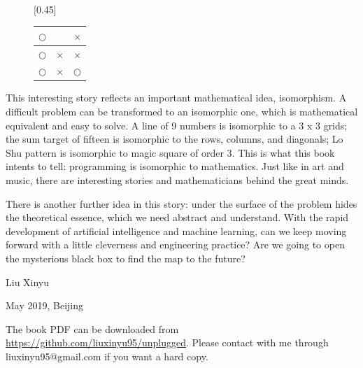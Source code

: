 \documentclass[UTF8]{article}
\begin{document}
\begin{figure}[htbp]
{\begin{tabular}{c|c|c}
   \end{tabular}
   \vspace{3mm}
 } \vspace{3mm} \\
 [0.45\linewidth]{
   \begin{tabular}{c|c|c}
   $\pmb{\bigcirc}$ &  & $\times$\\
   \hline
   $\pmb{\bigcirc}$ &  $\times$ & $\times$ \\
   \hline
   $\pmb{\bigcirc}$ & $\times$ & $\bigcirc$ \\
   \end{tabular}
   \vspace{3mm}
 }
 \captionsetup{labelformat=empty}
 \caption{}
 \label{fig:game-steps}
\end{figure}

This interesting story reflects an important mathematical idea, isomorphism. A difficult problem can be transformed to an isomorphic one, which is mathematical equivalent and easy to solve. A line of 9 numbers is isomorphic to a 3 x 3 grids; the sum target of fifteen is isomorphic to the rows, columns, and diagonals; Lo Shu pattern is isomorphic to magic square of order 3. This is what this book intents to tell: programming is isomorphic to mathematics. Just like in art and music, there are interesting stories and mathematicians behind the great minds.

There is another further idea in this story: under the surface of the problem hides the theoretical essence, which we need abstract and understand. With the rapid development of artificial intelligence and machine learning, can we keep moving forward with a little cleverness and engineering practice? Are we going to open the mysterious black box to find the map to the future?

\vspace{15mm}

Liu Xinyu

May 2019, Beijing

\begin{Exercise}
\end{Exercise}

\vspace{10mm}

The book PDF can be downloaded from \url{https://github.com/liuxinyu95/unplugged}. Please contact with me through liuxinyu95@gmail.com if you want a hard copy.

\ifx\wholebook\relax \else

\expandafter\enddocument

\fi
\end{document}
